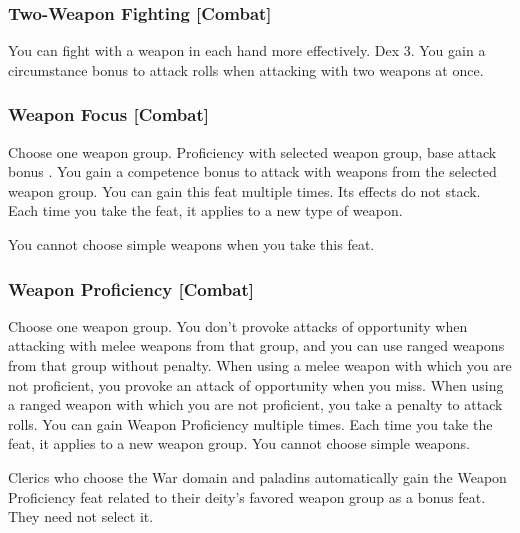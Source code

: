 \subsubsection{Two-Weapon Fighting [Combat]}
You can fight with a weapon in each hand more effectively.
 Dex 3.
 You gain a  circumstance bonus to attack rolls when attacking with two weapons at once.


\subsubsection{Weapon Focus [Combat]}
Choose one weapon group.
 Proficiency with selected weapon group, base attack bonus .
 You gain a  competence bonus to attack with weapons from the selected weapon group.
 You can gain this feat multiple times. Its effects do not stack. Each time you take the feat, it applies to a new type of weapon.
\par You cannot choose simple weapons when you take this feat.

\subsubsection{Weapon Proficiency [Combat]}
Choose one weapon group.
 You don't provoke attacks of opportunity when attacking with melee weapons from that group, and you can use ranged weapons from that group without penalty.
 When using a melee weapon with which you are not proficient, you provoke an attack of opportunity when you miss. When using a ranged weapon with which you are not proficient, you take a  penalty to attack rolls.
 You can gain Weapon Proficiency multiple times. Each time you take the feat, it applies to a new weapon group. You cannot choose simple weapons.
\par Clerics who choose the War domain and paladins automatically gain the Weapon Proficiency feat related to their deity's favored weapon group as a bonus feat. They need not select it.

